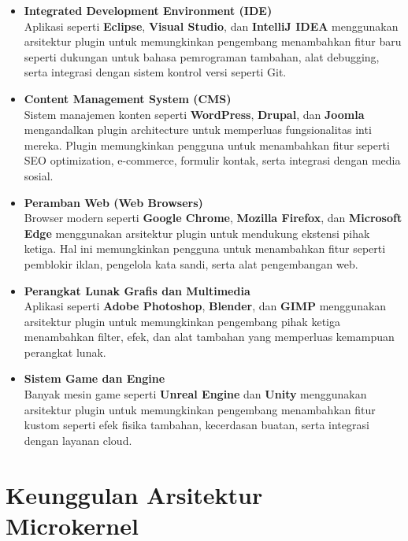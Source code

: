 \begin{itemize}
	\item \textbf{Integrated Development Environment (IDE)} \\
	Aplikasi seperti \textbf{Eclipse}, \textbf{Visual Studio}, dan \textbf{IntelliJ IDEA} menggunakan arsitektur plugin untuk memungkinkan pengembang menambahkan fitur baru seperti dukungan untuk bahasa pemrograman tambahan, alat debugging, serta integrasi dengan sistem kontrol versi seperti Git.
	
	\item \textbf{Content Management System (CMS)} \\
	Sistem manajemen konten seperti \textbf{WordPress}, \textbf{Drupal}, dan \textbf{Joomla} mengandalkan plugin architecture untuk memperluas fungsionalitas inti mereka. Plugin memungkinkan pengguna untuk menambahkan fitur seperti SEO optimization, e-commerce, formulir kontak, serta integrasi dengan media sosial.
	
	\item \textbf{Peramban Web (Web Browsers)} \\
	Browser modern seperti \textbf{Google Chrome}, \textbf{Mozilla Firefox}, dan \textbf{Microsoft Edge} menggunakan arsitektur plugin untuk mendukung ekstensi pihak ketiga. Hal ini memungkinkan pengguna untuk menambahkan fitur seperti pemblokir iklan, pengelola kata sandi, serta alat pengembangan web.
	
	\item \textbf{Perangkat Lunak Grafis dan Multimedia} \\
	Aplikasi seperti \textbf{Adobe Photoshop}, \textbf{Blender}, dan \textbf{GIMP} menggunakan arsitektur plugin untuk memungkinkan pengembang pihak ketiga menambahkan filter, efek, dan alat tambahan yang memperluas kemampuan perangkat lunak.
	
	\item \textbf{Sistem Game dan Engine} \\
	Banyak mesin game seperti \textbf{Unreal Engine} dan \textbf{Unity} menggunakan arsitektur plugin untuk memungkinkan pengembang menambahkan fitur kustom seperti efek fisika tambahan, kecerdasan buatan, serta integrasi dengan layanan cloud.
\end{itemize}



\section{Keunggulan Arsitektur Microkernel}

